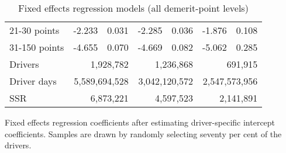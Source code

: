 \begin{table}
\begin{tabular}{l r r r r r r}
21-30 points  & -2.233  &  0.031  & -2.285  &  0.036  & -1.876  &  0.108   \\ 
 
31-150 points  & -4.655  &  0.070  & -4.669  &  0.082  & -5.062  &  0.285   \\ 
 

\hline 
 

Drivers 
 & \multicolumn{2}{r}{1,928,782}  & \multicolumn{2}{r}{1,236,868}  & \multicolumn{2}{r}{691,915}   \\ 
 

Driver days 
 & \multicolumn{2}{r}{5,589,694,528}  & \multicolumn{2}{r}{3,042,120,572}  & \multicolumn{2}{r}{2,547,573,956}   \\ 
 

SSR 
 & \multicolumn{2}{r}{6,873,221}  & \multicolumn{2}{r}{4,597,523}  & \multicolumn{2}{r}{2,141,891}   \\ 
 

\hline 
 
\end{tabular} 
\caption{Fixed effects regression models (all demerit-point levels)} 
Fixed effects regression coefficients after estimating driver-specific intercept coefficients. 
Samples are drawn by randomly selecting seventy per cent of the drivers. 
\label{tab:FE_regs_all_pts} 
\end{table} 
 
